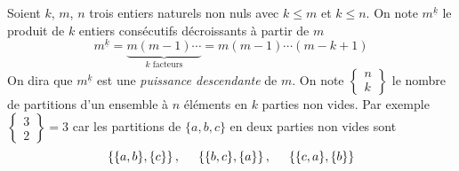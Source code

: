 Soient $k$, $m$, $n$ trois entiers naturels non nuls avec $k\leq m$ et $k\leq n$.\newline
On note $m^{\underline{k}}$ le produit de $k$ entiers consécutifs décroissants à partir de $m$ 
\begin{displaymath}
 m^{\underline{k}} = \underset{k \text{ facteurs}}{\underbrace{m(m-1) \cdots}} = m(m-1) \cdots (m-k+1)
\end{displaymath}
On dira que $m^{\underline{k}}$ est une \emph{puissance descendante} de $m$.\newline
On note
$ \left\lbrace \begin{matrix}
 n \\ k
\end{matrix}\right\rbrace 
$ 
le nombre de partitions d'un ensemble à $n$ éléments en $k$ parties non vides. Par exemple
$ \left\lbrace \begin{matrix}
 3 \\ 2
\end{matrix}\right\rbrace 
=3$
car les partitions de $\{a,b,c\}$ en deux parties non vides sont
\begin{displaymath}
 \left\lbrace \{a,b\},\{c\}\right\rbrace,\hspace{0.5cm} 
 \left\lbrace \{b,c\},\{a\}\right\rbrace,\hspace{0.5cm}
 \left\lbrace \{c,a\},\{b\}\right\rbrace
\end{displaymath}
